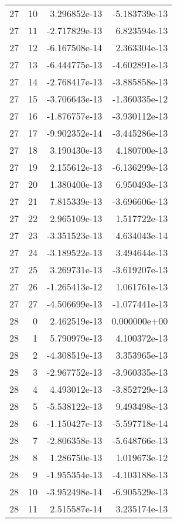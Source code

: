 \begin{tabular}{rrrr}
  27 &   10 &  3.296852e-13 & -5.183739e-13 \\
  27 &   11 & -2.717829e-13 &  6.823594e-13 \\
  27 &   12 & -6.167508e-14 &  2.363304e-13 \\
  27 &   13 & -6.444775e-13 & -4.602891e-13 \\
  27 &   14 & -2.768417e-13 & -3.885858e-13 \\
  27 &   15 & -3.706643e-13 & -1.360335e-12 \\
  27 &   16 & -1.876757e-13 & -3.930112e-13 \\
  27 &   17 & -9.902352e-14 & -3.445286e-13 \\
  27 &   18 &  3.190430e-13 &  4.180700e-13 \\
  27 &   19 &  2.155612e-13 & -6.136299e-13 \\
  27 &   20 &  1.380400e-13 &  6.950493e-13 \\
  27 &   21 &  7.815339e-13 & -3.696606e-13 \\
  27 &   22 &  2.965109e-13 &  1.517722e-13 \\
  27 &   23 & -3.351523e-13 &  4.634043e-14 \\
  27 &   24 & -3.189522e-13 &  3.494644e-13 \\
  27 &   25 &  3.269731e-13 & -3.619207e-13 \\
  27 &   26 & -1.265413e-12 &  1.061761e-13 \\
  27 &   27 & -4.506699e-13 & -1.077441e-13 \\
  28 &    0 &  2.462519e-13 &  0.000000e+00 \\
  28 &    1 &  5.790979e-13 &  4.100372e-13 \\
  28 &    2 & -4.308519e-13 &  3.353965e-13 \\
  28 &    3 & -2.967752e-13 & -3.960335e-13 \\
  28 &    4 &  4.493012e-13 & -3.852729e-13 \\
  28 &    5 & -5.538122e-13 &  9.493498e-13 \\
  28 &    6 & -1.150427e-13 & -5.597718e-14 \\
  28 &    7 & -2.806358e-13 & -5.648766e-13 \\
  28 &    8 &  1.286750e-13 &  1.019673e-12 \\
  28 &    9 & -1.955354e-13 & -4.103188e-13 \\
  28 &   10 & -3.952498e-14 & -6.905529e-13 \\
  28 &   11 &  2.515587e-14 &  3.235174e-13 \\

\end{tabular}
